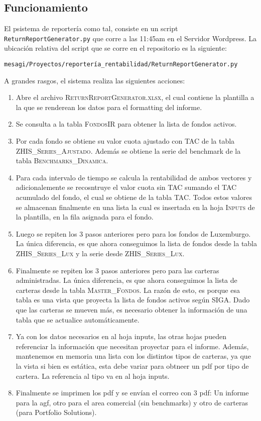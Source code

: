 \documentclass{article}
\begin{document}
\subsection{Funcionamiento}

El psistema de reportería como tal, consiste en un script \texttt{ReturnReportGenerator.py} que corre a las 11:45am en el Servidor Wordpress. La ubicación relativa del script que se corre en el repositorio es la siguiente:
\begin{center}
\texttt{mesagi/Proyectos/reportería\_rentabilidad/ReturnReportGenerator.py}
\end{center}

A grandes rasgos, el sistema realiza las siguientes acciones:


\begin{enumerate}
\item Abre el archivo \textsc{ReturnReportGenerator.xlsx}, el cual contiene la plantilla a la que se renderean los datos para el formatting del informe.
\item Se consulta a la tabla \textsc{FondosIR} para obtener la lista de fondos activos.
\item Por cada fondo se obtiene su valor cuota ajustado con TAC de la tabla \textsc{ZHIS\_Series\_Ajustado}. Además se obtiene la serie del benchmark de la tabla \textsc{Benchmarks\_Dinamica}.
\item Para cada intervalo de tiempo se calcula la rentabilidad de ambos vectores y adicionalemente se recosntruye el valor cuota sin TAC sumando el TAC acumulado del fondo, el cual se obtiene de la tabla \textsc{TAC}. Todos estos valores se almacenan finalmente en una lista la cual es insertada en la hoja \textsc{Inputs} de la plantilla, en la fila asignada para el fondo.
\item Luego se repiten los 3 pasos anteriores pero para los fondos de Luxemburgo. La única diferencia, es que ahora conseguimos la lista de fondos desde la tabla \textsc{ZHIS\_Series\_Lux} y la serie desde \textsc{ZHIS\_Series\_Lux}.
\item Finalmente se repiten los 3 pasos anteriores pero para las carteras administradas. La única diferencia, es que ahora conseguimos la lista de carteras desde la tabla \textsc{Master\_Fondos}. La razón de esto, es porque esa tabla es una vista que proyecta la lista de fondos activos según SIGA. Dado que las carteras se mueven más, es necesario obtener la información de una tabla que se actualice automáticamente.
\item Ya con los datos necesarios en al hoja inputs, las otras hojas pueden referenciar la información que necesitan proyectar para el informe. Además, mantenemos en memoria una lista con los distintos tipos de carteras, ya que la vista si bien es estática, esta debe variar para obtneer un pdf por tipo de cartera. La referencia al tipo va en al hoja inputs.
\item Finalmente se imprimen los pdf y se envían el correo con 3 pdf: Un informe para la agf, otro para el area comercial (sin benchmarks) y otro de carteras (para Portfolio Solutions).
\end{enumerate}
\end{document}

